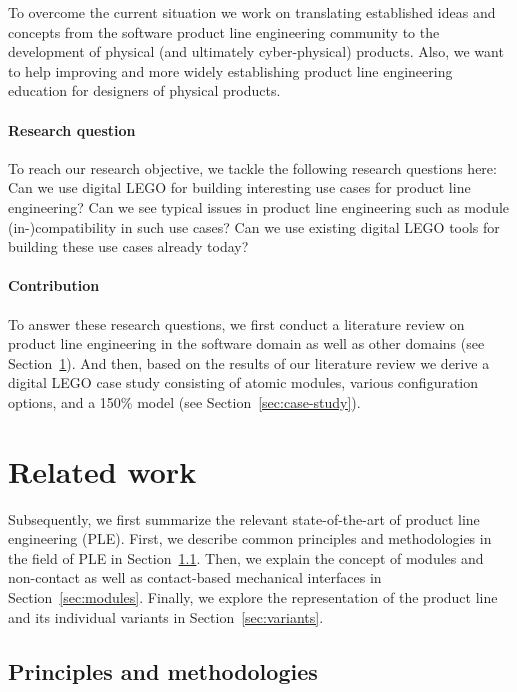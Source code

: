 \documentclass[sigconf,review,anonymous]{acmart}
\begin{document}
To overcome the current situation we work on translating established ideas and concepts from the software product line engineering community to the development of physical (and ultimately cyber-physical) products.
Also, we want to help improving and more widely establishing product line engineering education for designers of physical products.

\paragraph{Research question}

To reach our research objective, we tackle the following research questions here:
Can we use digital LEGO for building interesting use cases for product line engineering?
Can we see typical issues in product line engineering such as module (in-)compatibility in such use cases?
Can we use existing digital LEGO tools for building these use cases already today?

\paragraph{Contribution}

To answer these research questions, we first conduct a literature review on product line engineering in the software domain as well as other domains (see Section~\ref{sec:related-work}).
And then, based on the results of our literature review we derive a digital LEGO case study consisting of atomic modules, various configuration options, and a 150\% model (see Section~\ref{sec:case-study}).

\section{Related work}
\label{sec:related-work}

Subsequently, we first summarize the relevant state-of-the-art of product line engineering (PLE).
First, we describe common principles and methodologies in the field of PLE in Section~\ref{sec:principles}.
Then, we explain the concept of modules and non-contact as well as contact-based mechanical interfaces in Section~\ref{sec:modules}.
Finally, we explore the representation of the product line and its individual variants in Section~\ref{sec:variants}.

\subsection{Principles and methodologies}
\label{sec:principles}
\end{document}

